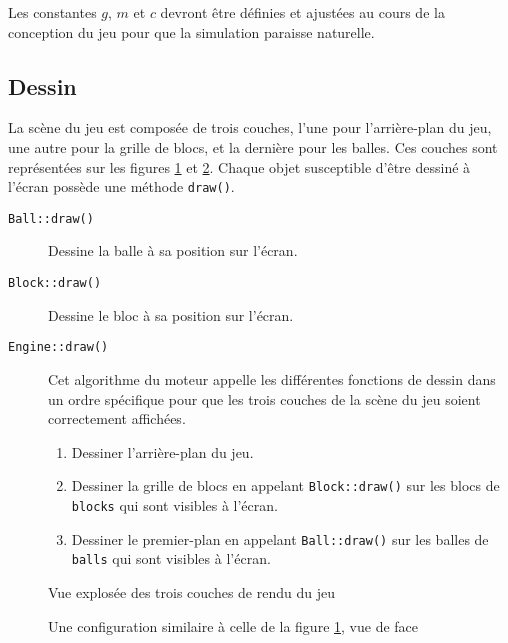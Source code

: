 Les constantes $g$, $m$ et $c$ devront être définies et
ajustées au cours de la conception du jeu pour que
la simulation paraisse naturelle.

\subsection{Dessin}

La scène du jeu est composée de trois couches, l'une pour
l'arrière-plan du jeu, une autre pour la grille de blocs,
et la dernière pour les balles. Ces couches sont représentées
sur les figures \ref{fig:ptf-layering-exploded} et \ref{fig:ptf-layering-merged}.
Chaque objet susceptible d'être dessiné à l'écran possède
une méthode \texttt{draw()}.

\begin{description}
    \item[\texttt{Ball::draw()}] Dessine la balle à sa position sur l'écran.
    \item[\texttt{Block::draw()}] Dessine le bloc à sa position sur l'écran.
    \item[\texttt{Engine::draw()}] Cet algorithme du moteur appelle les
    différentes fonctions de dessin dans un ordre spécifique pour que
    les trois couches de la scène du jeu soient correctement affichées.
    \begin{enumerate}
        \item Dessiner l'arrière-plan du jeu.
        \item Dessiner la grille de blocs en appelant \texttt{Block::draw()}
        sur les blocs de \texttt{blocks} qui sont visibles à l'écran.
        \item Dessiner le premier-plan en appelant \texttt{Ball::draw()} sur
        les balles de \texttt{balls} qui sont visibles à l'écran.
    \end{enumerate}
\end{description}

\begin{figure}[p!]
    \centering
    
    \caption{Vue explosée des trois couches de rendu du jeu}
    \label{fig:ptf-layering-exploded}
\end{figure}

\begin{figure}[p!]
    \centering
    
    \caption{Une configuration similaire à celle de la figure \ref{fig:ptf-layering-exploded}, vue de face}
    \label{fig:ptf-layering-merged}
\end{figure}

